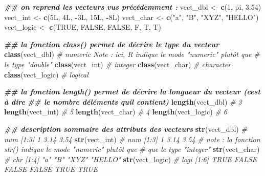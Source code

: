 \documentclass[
]{book}
\newenvironment{Shaded}{\begin{snugshade}}{\end{snugshade}}
\newcommand{\CommentTok}[1]{\textcolor[rgb]{0.56,0.35,0.01}{\textit{#1}}}
\newcommand{\ConstantTok}[1]{\textcolor[rgb]{0.56,0.35,0.01}{#1}}
\newcommand{\DataTypeTok}[1]{\textcolor[rgb]{0.13,0.29,0.53}{#1}}
\newcommand{\DecValTok}[1]{\textcolor[rgb]{0.00,0.00,0.81}{#1}}
\newcommand{\DocumentationTok}[1]{\textcolor[rgb]{0.56,0.35,0.01}{\textbf{\textit{#1}}}}
\newcommand{\FloatTok}[1]{\textcolor[rgb]{0.00,0.00,0.81}{#1}}
\newcommand{\FunctionTok}[1]{\textcolor[rgb]{0.13,0.29,0.53}{\textbf{#1}}}
\newcommand{\NormalTok}[1]{#1}
\newcommand{\OtherTok}[1]{\textcolor[rgb]{0.56,0.35,0.01}{#1}}
\newcommand{\SpecialCharTok}[1]{\textcolor[rgb]{0.81,0.36,0.00}{\textbf{#1}}}
\newcommand{\StringTok}[1]{\textcolor[rgb]{0.31,0.60,0.02}{#1}}
\begin{document}
\begin{Shaded}
\begin{Highlighting}[]
\DocumentationTok{\#\# on reprend les vecteurs vus précédemment : }
\NormalTok{vect\_dbl }\OtherTok{\textless{}{-}} \FunctionTok{c}\NormalTok{(}\DecValTok{1}\NormalTok{, pi, }\FloatTok{3.54}\NormalTok{)}
\NormalTok{vect\_int }\OtherTok{\textless{}{-}} \FunctionTok{c}\NormalTok{(}\DecValTok{5}\DataTypeTok{L}\NormalTok{, }\DecValTok{4}\DataTypeTok{L}\NormalTok{, }\SpecialCharTok{{-}}\DecValTok{3}\DataTypeTok{L}\NormalTok{, }\DecValTok{15}\DataTypeTok{L}\NormalTok{, }\SpecialCharTok{{-}}\DecValTok{8}\DataTypeTok{L}\NormalTok{) }
\NormalTok{vect\_char }\OtherTok{\textless{}{-}} \FunctionTok{c}\NormalTok{(}\StringTok{"a"}\NormalTok{, }\StringTok{"B"}\NormalTok{, }\StringTok{"XYZ"}\NormalTok{, }\StringTok{"HELLO"}\NormalTok{)}
\NormalTok{vect\_logic }\OtherTok{\textless{}{-}} \FunctionTok{c}\NormalTok{(}\ConstantTok{TRUE}\NormalTok{, }\ConstantTok{FALSE}\NormalTok{, }\ConstantTok{FALSE}\NormalTok{, F, T, T)}

\DocumentationTok{\#\# la fonction class() permet de décrire le type du vecteur}
\FunctionTok{class}\NormalTok{(vect\_dbl) }\CommentTok{\# numeric     Note : ici, R indique le mode "numeric" plutôt que }
                \CommentTok{\#                    le type "double"}
\FunctionTok{class}\NormalTok{(vect\_int) }\CommentTok{\# integer}
\FunctionTok{class}\NormalTok{(vect\_char) }\CommentTok{\# character}
\FunctionTok{class}\NormalTok{(vect\_logic) }\CommentTok{\# logical}

\DocumentationTok{\#\# la fonction length() permet de décrire la longueur du vecteur (c\textquotesingle{}est à dire}
\DocumentationTok{\#\# le nombre d\textquotesingle{}éléments qu\textquotesingle{}il contient)}
\FunctionTok{length}\NormalTok{(vect\_dbl) }\CommentTok{\# 3}
\FunctionTok{length}\NormalTok{(vect\_int) }\CommentTok{\# 5}
\FunctionTok{length}\NormalTok{(vect\_char) }\CommentTok{\# 4}
\FunctionTok{length}\NormalTok{(vect\_logic) }\CommentTok{\# 6}

\DocumentationTok{\#\# description sommaire des attributs des vecteurs}
\FunctionTok{str}\NormalTok{(vect\_dbl) }\CommentTok{\# num [1:3] 1 3.14 3.54}
\FunctionTok{str}\NormalTok{(vect\_int) }\CommentTok{\# num [1:3] 1 3.14 3.54 }
              \CommentTok{\# note : la fonction str() indique le mode "numeric" plutôt que }
              \CommentTok{\#        que le type "integer" }
\FunctionTok{str}\NormalTok{(vect\_char) }\CommentTok{\# chr [1:4] "a" "B" "XYZ" "HELLO"}
\FunctionTok{str}\NormalTok{(vect\_logic) }\CommentTok{\# logi [1:6] TRUE FALSE FALSE FALSE TRUE TRUE}
\end{Highlighting}
\end{Shaded}
\end{document}
